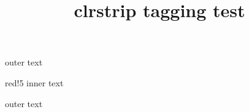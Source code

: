 \documentclass{article}
\title{clrstrip tagging test}
\begin{document}
outer text
\begin{colorstrip}{red!5}
inner text
\end{colorstrip}
outer text
\end{document}
